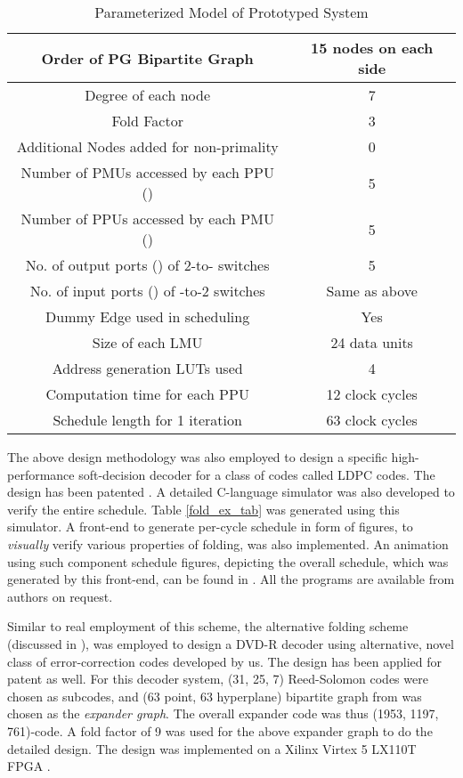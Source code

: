 \documentclass[12pt]{article}
\begin{document}
\begin{table}[h]
\caption{Parameterized Model of Prototyped System}
\label{prot_sys_tab}
\centering
\begin{tabular}[!h]{|c|c|}
\hline \hline
Order of PG Bipartite Graph & 15 nodes on each side \\ \hline
Degree of each node & 7 \\ \hline
Fold Factor & 3 \\ \hline
Additional Nodes added for non-primality & 0 \\ \hline
Number of PMUs accessed by each PPU () & 5 \\
\hline
Number of PPUs accessed by each PMU () & 5 \\
\hline
No. of output ports () of 2-to- switches & 5 \\ \hline
No. of input ports () of -to-2 switches & Same as above \\ \hline
Dummy Edge used in scheduling & Yes \\ \hline
Size of each LMU & 24 data units \\ \hline
Address generation LUTs used & 4 \\ \hline
Computation time for each PPU & 12 clock cycles \\ \hline
Schedule length for 1 iteration & 63 clock cycles \\ \hline \hline

\end{tabular}
\end{table}

The above design methodology was also employed to design a
specific high-performance soft-decision \cite{fossorier} decoder
for a class of codes called LDPC codes. The design has been patented
\cite{ldpc_foldpat}. A detailed C-language simulator was also
developed to verify the entire schedule. Table \ref{fold_ex_tab} was
generated using this simulator. A front-end to generate
per-cycle schedule in form of figures, to \textit{visually} verify various
properties of folding, was also implemented. An animation using such
component schedule figures, depicting the overall schedule,
which was generated by this front-end, can be found in
\cite{fold2_techrep}. All the programs are available from authors
on request.

Similar to real employment of this scheme, the alternative folding
scheme (discussed in \cite{expanders}), was employed to design a DVD-R
decoder using alternative, novel class of error-correction codes developed
by us. The design has been applied for patent as well. For this
decoder system, (31, 25, 7) Reed-Solomon codes were chosen as
subcodes, and (63 point, 63 hyperplane) bipartite graph from {\normalsize
} was chosen as the \textit{expander graph}.
The overall expander code was thus (1953, 1197, 761)-code. A
fold factor
of 9 was used for the above expander graph to do the detailed design. The
design was implemented on a Xilinx Virtex 5 LX110T FPGA \cite{overview_manual}.
\end{document}
